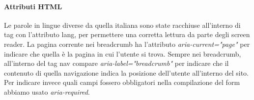 \paragraph{Attributi HTML} 
Le parole in lingue diverse da quella italiana sono state racchiuse all’interno di tag con l’attributo lang, per permettere una corretta lettura da parte degli screen reader. La pagina corrente nei breadcrumb ha l'attributo \textit{aria-current="page"} per indicare che quella è la pagina in cui l'utente si trova. Sempre nei breadcrumb, all'interno del tag nav compare \textit{aria-label="breadcrumb"} per indicare che il contenuto di quella navigazione indica la posizione dell'utente all'interno del sito.\\
Per indicare invece quali campi fossero obbligatori nella compilazione del form abbiamo usato \textit{aria-required}.